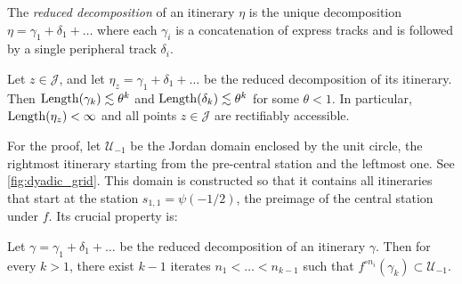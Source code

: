 \begin{definition}
	The \emph{reduced decomposition} of an itinerary $\eta$ is the unique decomposition $\eta=\gamma_1 + \delta_1 + \dots$ where each $\gamma_i$ is a concatenation of express tracks and is followed by a single peripheral track $\delta_i$.
\end{definition}

\begin{proposition} \label{prop:finite-length}
	Let $z \in \mathcal J$, and let $\eta_z= \gamma_1 + \delta_1 + \dots  $ be the reduced decomposition of its itinerary. Then $\operatorname{Length}(\gamma_k)\lesssim \theta^k$ and $\operatorname{Length}(\delta_k)\lesssim \theta^k$ for some $\theta < 1$. In particular, $\operatorname{Length}(\eta_z)<\infty$ and all points $z\mathcal \in \mathcal J$ are rectifiably accessible.
\end{proposition}

For the proof, let $\mathcal U_{-1}$ be the Jordan domain enclosed by the unit circle, 
the rightmost itinerary starting from the pre-central station and the leftmost one. 
See \cref{fig:dyadic_grid}.
This domain is constructed so that it contains all itineraries that start at the station 
$s_{1,1} = \psi(-1/2)$, the preimage of the central station under $f$. Its crucial property is: 

\begin{lemma} \label{lemma-enough-visits-of-premain_station}
	Let $\gamma = \gamma_1 + \delta_1 + \dots $ be the reduced decomposition of an itinerary $\gamma$. Then for every $k > 1$, there exist $k-1$ iterates $n_1 < \dots < n_{k-1}$ such that $f^{\circ {n_i}}(\gamma_k) \subset \mathcal U_{-1}$. %
\end{lemma}

